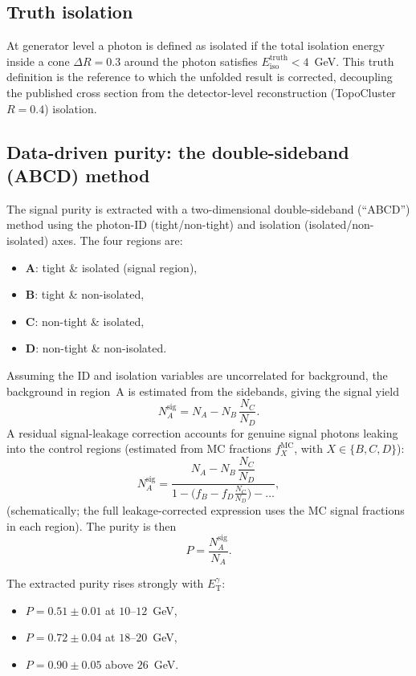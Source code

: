 \documentclass[11pt]{article}
\newcommand{\ETg}{E_{\mathrm{T}}^{\gamma}}
\newcommand{\Eiso}{E_{\mathrm{iso}}}
\newcommand{\dr}{\Delta R}
\begin{document}
\subsection{Truth isolation}

At generator level a photon is defined as isolated if the total isolation energy
inside a cone $\dr = 0.3$ around the photon satisfies
$\Eiso^{\mathrm{truth}} < 4$~GeV. This truth definition is the reference to which
the unfolded result is corrected, decoupling the published cross section from
the detector-level reconstruction (TopoCluster $R=0.4$) isolation.

\subsection{Data-driven purity: the double-sideband (ABCD) method}

The signal purity is extracted with a two-dimensional double-sideband (``ABCD'')
method using the photon-ID (tight/non-tight) and isolation (isolated/non-isolated)
axes. The four regions are:
\begin{itemize}[noitemsep]
  \item \textbf{A}: tight \& isolated (signal region),
  \item \textbf{B}: tight \& non-isolated,
  \item \textbf{C}: non-tight \& isolated,
  \item \textbf{D}: non-tight \& non-isolated.
\end{itemize}
Assuming the ID and isolation variables are uncorrelated for background, the
background in region~A is estimated from the sidebands, giving the signal yield
\begin{equation}
  N_A^{\mathrm{sig}} = N_A - N_B\,\frac{N_C}{N_D}.
\end{equation}
A residual signal-leakage correction accounts for genuine signal photons leaking
into the control regions (estimated from MC fractions $f_X^{\mathrm{MC}}$, with
$X\in\{B,C,D\}$):
\begin{equation}
  N_A^{\mathrm{sig}} = \frac{N_A - N_B\,\dfrac{N_C}{N_D}}
  {1 - \big(f_B - f_D\tfrac{N_C}{N_D}\big) - \dots},
\end{equation}
(schematically; the full leakage-corrected expression uses the MC signal
fractions in each region). The purity is then
\begin{equation}
  P = \frac{N_A^{\mathrm{sig}}}{N_A}.
\end{equation}

The extracted purity rises strongly with $\ETg$:
\begin{itemize}[noitemsep]
  \item $P = 0.51 \pm 0.01$ at $10$--$12$~GeV,
  \item $P = 0.72 \pm 0.04$ at $18$--$20$~GeV,
  \item $P = 0.90 \pm 0.05$ above $26$~GeV.
\end{itemize}
\end{document}
